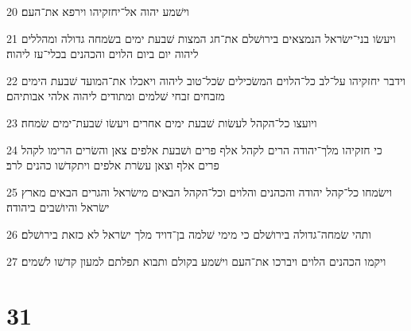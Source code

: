 \par 20 וישׁמע יהוה אל־יחזקיהו וירפא את־העם׃
\par 21 ויעשׂו בני־ישׂראל הנמצאים בירושׁלם את־חג המצות שׁבעת ימים בשׂמחה גדולה ומהללים ליהוה יום ביום הלוים והכהנים בכלי־עז ליהוה׃
\par 22 וידבר יחזקיהו על־לב כל־הלוים המשׂכילים שׂכל־טוב ליהוה ויאכלו את־המועד שׁבעת הימים מזבחים זבחי שׁלמים ומתודים ליהוה אלהי אבותיהם׃
\par 23 ויועצו כל־הקהל לעשׂות שׁבעת ימים אחרים ויעשׂו שׁבעת־ימים שׂמחה׃
\par 24 כי חזקיהו מלך־יהודה הרים לקהל אלף פרים ושׁבעת אלפים צאן והשׂרים הרימו לקהל פרים אלף וצאן עשׂרת אלפים ויתקדשׁו כהנים לרב׃
\par 25 וישׂמחו כל־קהל יהודה והכהנים והלוים וכל־הקהל הבאים מישׂראל והגרים הבאים מארץ ישׂראל והיושׁבים ביהודה׃
\par 26 ותהי שׂמחה־גדולה בירושׁלם כי מימי שׁלמה בן־דויד מלך ישׂראל לא כזאת בירושׁלם׃
\par 27 ויקמו הכהנים הלוים ויברכו את־העם וישׁמע בקולם ותבוא תפלתם למעון קדשׁו לשׁמים׃

\chapter{31}


